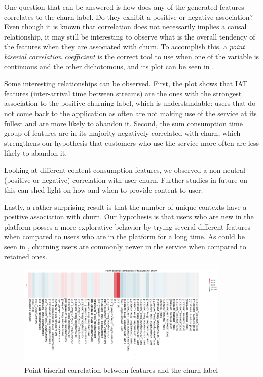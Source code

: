 \documentclass{kththesis}
\begin{document}
One question that can be answered is how does any of the generated features correlates to the churn label. Do they exhibit a positive or negative association? Even though it is known that correlation does not necessarily implies a causal relationship, it may still be interesting to observe what is the overall tendency of the features when they are associated with churn. To accomplish this, a \emph{point biserial correlation coefficient} is the correct tool to use when one of the variable is continuous and the other dichotomous, and its plot can be seen in .

Some interesting relationships can be observed. First, the plot shows that IAT features (inter-arrival time between streams) are the ones with the strongest association to the positive churning label, which is understandable: users that do not come back to the application as often are not making use of the service at its fullest and are more likely to abandon it. Second, the sum consumption time group of features are in its majority negatively correlated with churn, which strengthens our hypothesis that customers who use the service more often are less likely to abandon it. 

Looking at different content consumption features, we observed a non neutral (positive or negative) correlation with user churn. Further studies in future on this can shed light on how and when to provide content to user.

Lastly, a rather surprising result is that the number of unique contexts have a positive association with churn. Our hypothesis is that users who are new in the platform posses a more explorative behavior by trying several different features when compared to users who are in the platform for a long time. As could be seen in , churning users are commonly newer in the service when compared to retained ones. 

	\begin{figure}[H]
    \centering
    \includegraphics[width=0.9\textwidth,keepaspectratio]{figures/corr_pbs.pdf}
    \caption{Point-biserial correlation between features and the churn label}
    \label{fig:corr_pbs}
	\end{figure}
\end{document}
